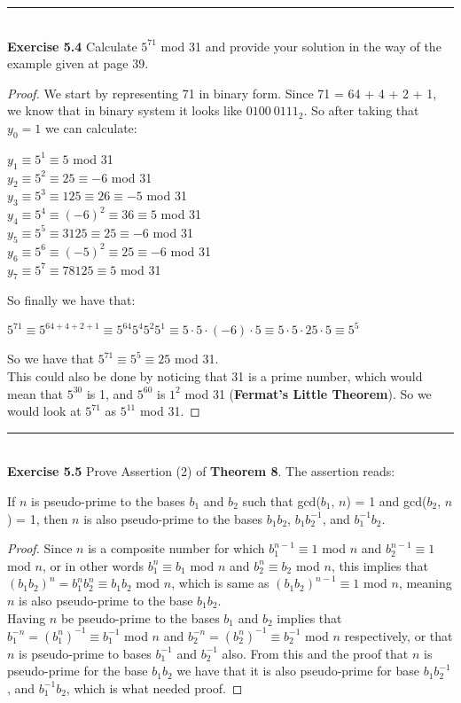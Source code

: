\documentclass[a4paper]{article}
\begin{document}
\noindent\rule{12cm}{0.4pt}\\
\noindent \textbf{Exercise 5.4} Calculate $5^{71}$ mod 31 and provide your solution in the way of the example given at page 39.
\begin{proof}
We start by representing 71 in binary form. Since 71 = 64 + 4 + 2 + 1, we know that in binary system it looks like $0100\ 0111_{2}$. So after taking that $y_0 = 1$ we can calculate:
\begin{center}
$y_1 \equiv 5^1 \equiv 5$ mod 31\\
$y_2 \equiv 5^2 \equiv 25 \equiv -6$ mod 31\\
$y_3 \equiv 5^3 \equiv 125 \equiv 26 \equiv -5$ mod 31\\
$y_4 \equiv 5^4 \equiv (-6)^2 \equiv 36 \equiv 5$ mod 31\\
$y_5 \equiv 5^5 \equiv 3125 \equiv 25 \equiv -6$ mod 31\\
$y_6 \equiv 5^6 \equiv (-5)^2 \equiv 25 \equiv -6$ mod 31\\
$y_7 \equiv 5^7 \equiv 78125 \equiv 5$ mod 31\\
\end{center}
So finally we have that:
\begin{center}
$5^{71} \equiv 5^{64+4+2+1} \equiv 5^{64}5^{4}5^{2}5^{1} \equiv 5 \cdot 5 \cdot (-6) \cdot 5 \equiv 5 \cdot 5 \cdot 25 \cdot 5 \equiv 5^5$
\end{center}
So we have that $5^71 \equiv 5^5 \equiv 25$ mod 31.\\
This could also be done by noticing that 31 is a prime number, which would mean that $5^{30}$ is 1, and $5^{60}$ is $1^2$ mod 31 (\textbf{Fermat's Little Theorem}). So we would look at $5^{71}$ as $5^{11}$ mod 31.
\end{proof}



\noindent\rule{12cm}{0.4pt}\\
\noindent \textbf{Exercise 5.5} Prove Assertion (2) of \textbf{Theorem 8}. The assertion reads:
\begin{center}
If $n$ is pseudo-prime to the bases $b_1$ and $b_2$ such that gcd($b_1$, $n$) = 1 and gcd($b_2$, $n$) = 1, then $n$ is also pseudo-prime to the bases $b_{1}b_{2}$, $b_{1}b_{2}^{-1}$, and $b_{1}^{-1}b_{2}$.
\end{center}
\begin{proof}
Since $n$ is a composite number for which $b_{1}^{n-1} \equiv 1$ mod $n$ and $b_{2}^{n-1} \equiv 1$ mod $n$, or in other words $b_{1}^n \equiv b_{1}$ mod $n$ and $b_{2}^n \equiv b_{2}$ mod $n$, this implies that $(b_{1}b_{2})^n = b_{1}^{n}b_{2}^{n} \equiv b_{1}b_{2}$ mod $n$, which is same as $(b_{1}b_{2})^{n-1} \equiv 1$ mod $n$, meaning $n$ is also pseudo-prime to the base $b_{1}b_{2}$.\\
Having $n$ be pseudo-prime to the bases $b_1$ and $b_2$ implies that $b_1^{-n} = {(b_1^{n})}^{-1} \equiv b_1^{-1}$ mod $n$ and $b_2^{-n} = {(b_2^{n})}^{-1} \equiv b_2^{-1}$ mod $n$ respectively, or that $n$ is pseudo-prime to bases $b_{1}^{-1}$ and $b_{2}^{-1}$ also. From this and the proof that $n$ is pseudo-prime for the base $b_{1}b_{2}$ we have that it is also pseudo-prime for base $b_{1}b_{2}^{-1}$, and $b_{1}^{-1}b_{2}$, which is what needed proof.
\end{proof}
\end{document}
